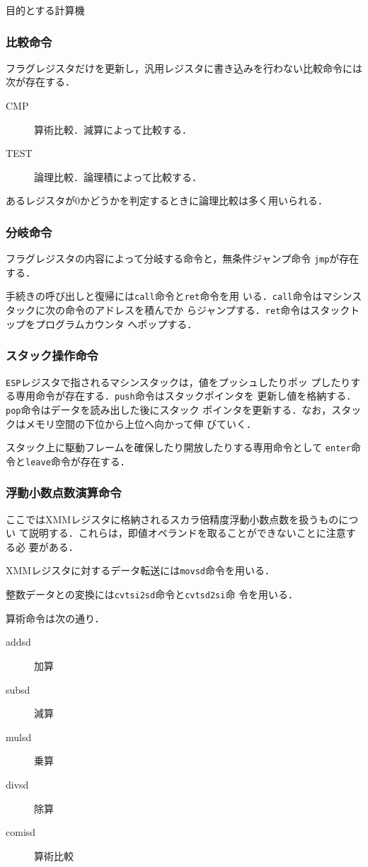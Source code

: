 \documentclass[a4paper,titlepage,report]{jsbook}
\begin{document}
\begin{resbonsiblesection}{目的とする計算機}{\kobori}
\subsubsection{比較命令}
フラグレジスタだけを更新し，汎用レジスタに書き込みを行わない比較命令には
次が存在する．
\begin{description}
 \item[CMP] 算術比較．減算によって比較する．
 \item[TEST] 論理比較．論理積によって比較する．
\end{description}
あるレジスタが0かどうかを判定するときに論理比較は多く用いられる．

\subsubsection{分岐命令}
フラグレジスタの内容によって分岐する命令と，無条件ジャンプ命令
\lstinline|jmp|が存在する．

手続きの呼び出しと復帰には\lstinline|call|命令と\lstinline|ret|命令を用
いる．\lstinline|call|命令はマシンスタックに次の命令のアドレスを積んでか
らジャンプする．\lstinline|ret|命令はスタックトップをプログラムカウンタ
へポップする．

\subsubsection{スタック操作命令}
\lstinline|ESP|レジスタで指されるマシンスタックは，値をプッシュしたりポッ
プしたりする専用命令が存在する．\lstinline|push|命令はスタックポインタを
更新し値を格納する．\lstinline|pop|命令はデータを読み出した後にスタック
ポインタを更新する．なお，スタックはメモリ空間の下位から上位へ向かって伸
びていく．

スタック上に駆動フレームを確保したり開放したりする専用命令として
\lstinline|enter|命令と\lstinline|leave|命令が存在する．

\subsubsection{浮動小数点数演算命令}
ここではXMMレジスタに格納されるスカラ倍精度浮動小数点数を扱うものについ
て説明する．これらは，即値オペランドを取ることができないことに注意する必
要がある．

XMMレジスタに対するデータ転送には\lstinline|movsd|命令を用いる．

整数データとの変換には\lstinline|cvtsi2sd|命令と\lstinline|cvtsd2si|命
令を用いる．

算術命令は次の通り．
\begin{description}
 \item[addsd] 加算
 \item[subsd] 減算
 \item[mulsd] 乗算
 \item[divsd] 除算
 \item[comisd] 算術比較
\end{description}


\end{resbonsiblesection}
\end{document}
